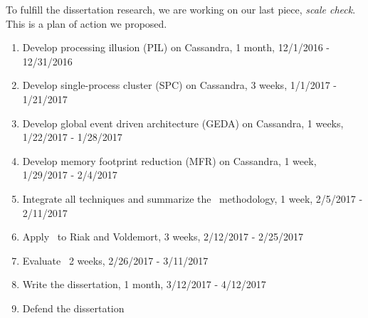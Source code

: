 To fulfill the dissertation research, we are working on our last piece, {\em
scale check}. This is a plan of action we proposed.

\begin{enumerate}

\item Develop processing illusion (PIL) on Cassandra, 1 month, 12/1/2016 - 12/31/2016

\item Develop single-process cluster (SPC) on Cassandra, 3 weeks, 1/1/2017 - 1/21/2017

\item Develop global event driven architecture (GEDA) on Cassandra, 1 weeks, 1/22/2017 - 1/28/2017

\item Develop memory footprint reduction (MFR) on Cassandra, 1 week, 1/29/2017 - 2/4/2017

\item Integrate all techniques and summarize the \sck\ methodology, 1 week, 2/5/2017 - 2/11/2017

\item Apply \sck\ to Riak and Voldemort, 3 weeks, 2/12/2017 - 2/25/2017

\item Evaluate \sck\, 2 weeks, 2/26/2017 - 3/11/2017

\item Write the dissertation, 1 month, 3/12/2017 - 4/12/2017

\item Defend the dissertation

\end{enumerate}

